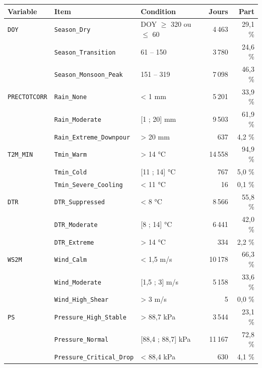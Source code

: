 \small
\begin{tabular}{lllrr}
\toprule
\rowcolor{NuitBleue!90}
\color{white}\textbf{Variable} & \color{white}\textbf{Item} & \color{white}\textbf{Condition} & \color{white}\textbf{Jours} & \color{white}\textbf{Part} \\
\midrule
\texttt{DOY} & \texttt{Season\_Dry} & DOY $\geq$ 320 ou $\leq$ 60 & 4\,463 & 29,1 \% \\
 & \texttt{Season\_Transition} & 61 -- 150 & 3\,780 & 24,6 \% \\
 & \texttt{Season\_Monsoon\_Peak} & 151 -- 319 & 7\,098 & 46,3 \% \\
\addlinespace[2pt]
\texttt{PRECTOTCORR} & \texttt{Rain\_None} & < 1 mm & 5\,201 & 33,9 \% \\
 & \texttt{Rain\_Moderate} & [1 ; 20] mm & 9\,503 & 61,9 \% \\
 & \texttt{Rain\_Extreme\_Downpour} & > 20 mm & 637 & 4,2 \% \\
\addlinespace[2pt]
\texttt{T2M\_MIN} & \texttt{Tmin\_Warm} & > 14 °C & 14\,558 & 94,9 \% \\
 & \texttt{Tmin\_Cold} & [11 ; 14] °C & 767 & 5,0 \% \\
 & \texttt{Tmin\_Severe\_Cooling} & < 11 °C & 16 & 0,1 \% \\
\addlinespace[2pt]
\texttt{DTR} & \texttt{DTR\_Suppressed} & < 8 °C & 8\,566 & 55,8 \% \\
 & \texttt{DTR\_Moderate} & [8 ; 14] °C & 6\,441 & 42,0 \% \\
 & \texttt{DTR\_Extreme} & > 14 °C & 334 & 2,2 \% \\
\addlinespace[2pt]
\texttt{WS2M} & \texttt{Wind\_Calm} & < 1,5 m/s & 10\,178 & 66,3 \% \\
 & \texttt{Wind\_Moderate} & [1,5 ; 3] m/s & 5\,158 & 33,6 \% \\
 & \texttt{Wind\_High\_Shear} & > 3 m/s & 5 & 0,0 \% \\
\addlinespace[2pt]
\texttt{PS} & \texttt{Pressure\_High\_Stable} & > 88,7 kPa & 3\,544 & 23,1 \% \\
 & \texttt{Pressure\_Normal} & [88,4 ; 88,7] kPa & 11\,167 & 72,8 \% \\
 & \texttt{Pressure\_Critical\_Drop} & < 88,4 kPa & 630 & 4,1 \% \\
\bottomrule
\end{tabular}
